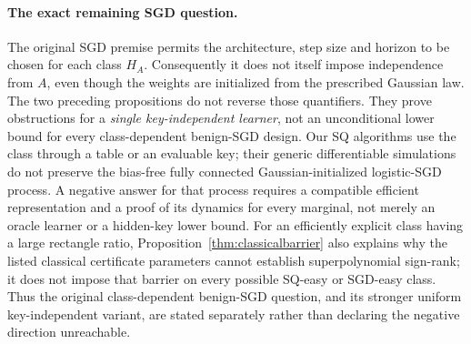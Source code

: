 \paragraph{The exact remaining SGD question.}
The original SGD premise permits the architecture, step size and horizon to be chosen for each class $H_A$. Consequently it does not itself impose independence from $A$, even though the weights are initialized from the prescribed Gaussian law. The two preceding propositions do not reverse those quantifiers. They prove obstructions for a \emph{single key-independent learner}, not an unconditional lower bound for every class-dependent benign-SGD design. Our SQ algorithms use the class through a table or an evaluable key; their generic differentiable simulations do not preserve the bias-free fully connected Gaussian-initialized logistic-SGD process. A negative answer for that process requires a compatible efficient representation and a proof of its dynamics for every marginal, not merely an oracle learner or a hidden-key lower bound. For an efficiently explicit class having a large rectangle ratio, Proposition~\ref{thm:classicalbarrier} also explains why the listed classical certificate parameters cannot establish superpolynomial sign-rank; it does not impose that barrier on every possible SQ-easy or SGD-easy class. Thus the original class-dependent benign-SGD question, and its stronger uniform key-independent variant, are stated separately rather than declaring the negative direction unreachable.
